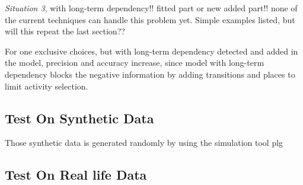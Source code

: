 \emph{Situation 3}, with long-term dependency!! fitted part or new added part!! none of the current techniques can handle this problem yet.
Simple examples listed, but will this repeat the last section?? 


For one exclusive choices, 
but with long-term dependency detected and added in the model, precision and accuracy increase, since model with long-term dependency blocks the negative information by adding transitions and places to limit activity selection. 
\subsection{Test On Synthetic Data}
Those synthetic data is generated randomly by using the simulation tool plg %
\subsection{Test On Real life Data}
